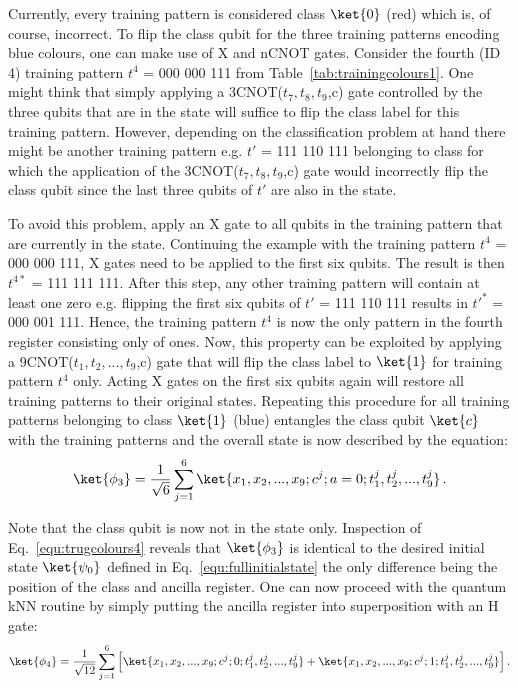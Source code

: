 Currently, every training pattern is considered class $\ket{0}$ (red) which is, of course, incorrect. To flip the class qubit for the three training patterns encoding blue colours, one can make use of X and nCNOT gates. Consider the fourth (ID 4) training pattern $t^4$ = 000 000 111 from Table~\ref{tab:trainingcolours1}. One might think that simply applying a 3CNOT($t_7,t_8,t_9$,c) gate controlled by the three qubits that are in the \1 state will suffice to flip the class label for this training pattern. However, depending on the classification problem at hand there might be another training pattern e.g. $t'$ = 111 110 111 belonging to class \0 for which the application of the 3CNOT($t_7,t_8,t_9$,c) gate would incorrectly flip the class qubit since the last three qubits of $t'$ are also in the \1 state.

To avoid this problem, apply an X gate to all qubits in the training pattern that are currently in the \0 state. Continuing the example with the training pattern $t^4$ = 000 000 111, X gates need to be applied to the first six qubits. The result is then $t^{4*}$ = 111 111 111. After this step, any other training pattern will contain at least one zero e.g. flipping the first six qubits of $t'$ = 111 110 111 results in $t'^{*}$ = 000 001 111. Hence, the training pattern $t^4$ is now the only pattern in the fourth register consisting only of ones. Now, this property can be exploited by applying a 9CNOT($t_1,t_2,...,t_9$,c) gate that will flip the class label to $\ket{1}$ for training pattern $t^4$ only. Acting X gates on the first six qubits again will restore all training patterns to their original states. Repeating this procedure for all training patterns belonging to class $\ket{1}$ (blue) entangles the class qubit $\ket{c}$ with the training patterns and the overall state is now described by the equation:
\begin{equation}
\label{equ:trugcolours4}
\ket{\phi_3} = \frac{1}{\sqrt{6}} \sum^6_{j=1} \ket{x_1,x_2,...,x_9;c^j;a=0;t^j_1,t^j_2,...,t^j_9}\, .
\end{equation}

Note that the class qubit is now not in the \0 state only. Inspection of Eq.~\ref{equ:trugcolours4} reveals that $\ket{\phi_3}$ is identical to the desired initial state $\ket{\psi_0}$ defined in Eq.~\ref{equ:fullinitialstate} the only difference being the position of the class and ancilla register. One can now proceed with the quantum kNN routine by simply putting the ancilla register into superposition with an H gate:
\begin{equation}
\label{equ:trugcolours5}
\ket{\phi_4} = \frac{1}{\sqrt{12}} \sum^6_{j=1} \Big[\ket{x_1,x_2,...,x_9;c^j;0;t^j_1,t^j_2,...,t^j_9} + \ket{x_1,x_2,...,x_9;c^j;1;t^j_1,t^j_2,...,t^j_9}\Big]\, .
\end{equation}

